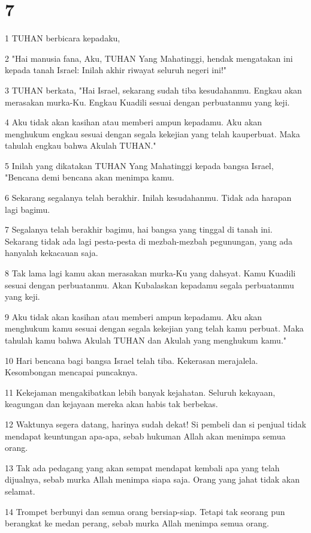 \chapter{7}

\par 1 TUHAN berbicara kepadaku,
\par 2 "Hai manusia fana, Aku, TUHAN Yang Mahatinggi, hendak mengatakan ini kepada tanah Israel: Inilah akhir riwayat seluruh negeri ini!"
\par 3 TUHAN berkata, "Hai Israel, sekarang sudah tiba kesudahanmu. Engkau akan merasakan murka-Ku. Engkau Kuadili sesuai dengan perbuatanmu yang keji.
\par 4 Aku tidak akan kasihan atau memberi ampun kepadamu. Aku akan menghukum engkau sesuai dengan segala kekejian yang telah kauperbuat. Maka tahulah engkau bahwa Akulah TUHAN."
\par 5 Inilah yang dikatakan TUHAN Yang Mahatinggi kepada bangsa Israel, "Bencana demi bencana akan menimpa kamu.
\par 6 Sekarang segalanya telah berakhir. Inilah kesudahanmu. Tidak ada harapan lagi bagimu.
\par 7 Segalanya telah berakhir bagimu, hai bangsa yang tinggal di tanah ini. Sekarang tidak ada lagi pesta-pesta di mezbah-mezbah pegunungan, yang ada hanyalah kekacauan saja.
\par 8 Tak lama lagi kamu akan merasakan murka-Ku yang dahsyat. Kamu Kuadili sesuai dengan perbuatanmu. Akan Kubalaskan kepadamu segala perbuatanmu yang keji.
\par 9 Aku tidak akan kasihan atau memberi ampun kepadamu. Aku akan menghukum kamu sesuai dengan segala kekejian yang telah kamu perbuat. Maka tahulah kamu bahwa Akulah TUHAN dan Akulah yang menghukum kamu."
\par 10 Hari bencana bagi bangsa Israel telah tiba. Kekerasan merajalela. Kesombongan mencapai puncaknya.
\par 11 Kekejaman mengakibatkan lebih banyak kejahatan. Seluruh kekayaan, keagungan dan kejayaan mereka akan habis tak berbekas.
\par 12 Waktunya segera datang, harinya sudah dekat! Si pembeli dan si penjual tidak mendapat keuntungan apa-apa, sebab hukuman Allah akan menimpa semua orang.
\par 13 Tak ada pedagang yang akan sempat mendapat kembali apa yang telah dijualnya, sebab murka Allah menimpa siapa saja. Orang yang jahat tidak akan selamat.
\par 14 Trompet berbunyi dan semua orang bersiap-siap. Tetapi tak seorang pun berangkat ke medan perang, sebab murka Allah menimpa semua orang.

